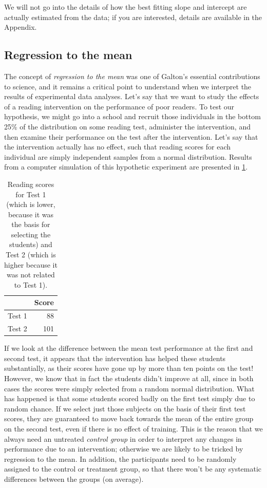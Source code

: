 \documentclass[12pt,]{book}
\theoremstyle{definition}
\theoremstyle{definition}
\theoremstyle{definition}
\theoremstyle{remark}
\begin{document}
We will not go into the details of how the best fitting slope and intercept are actually estimated from the data; if you are interested, details are available in the Appendix.

\hypertarget{regression-to-the-mean}{%
\subsection{Regression to the mean}\label{regression-to-the-mean}}

The concept of \emph{regression to the mean} was one of Galton's essential contributions to science, and it remains a critical point to understand when we interpret the results of experimental data analyses. Let's say that we want to study the effects of a reading intervention on the performance of poor readers. To test our hypothesis, we might go into a school and recruit those individuals in the bottom 25\% of the distribution on some reading test, administer the intervention, and then examine their performance on the test after the intervention. Let's say that the intervention actually has no effect, such that reading scores for each individual are simply independent samples from a normal distribution. Results from a computer simulation of this hypothetic experiment are presented in \ref{tab:readingTable}.

\begin{table}

\caption{\label{tab:readingTable}Reading scores for Test 1 (which is lower, because it was the basis for selecting the students) and Test 2 (which is higher because it was not related to Test 1).}
\centering
\begin{tabular}[t]{l|r}
\hline
  & Score\\
\hline
Test 1 & 88\\
\hline
Test 2 & 101\\
\hline
\end{tabular}
\end{table}

If we look at the difference between the mean test performance at the first and second test, it appears that the intervention has helped these students substantially, as their scores have gone up by more than ten points on the test! However, we know that in fact the students didn't improve at all, since in both cases the scores were simply selected from a random normal distribution. What has happened is that some students scored badly on the first test simply due to random chance. If we select just those subjects on the basis of their first test scores, they are guaranteed to move back towards the mean of the entire group on the second test, even if there is no effect of training. This is the reason that we always need an untreated \emph{control group} in order to interpret any changes in performance due to an intervention; otherwise we are likely to be tricked by regression to the mean. In addition, the participants need to be randomly assigned to the control or treatment group, so that there won't be any systematic differences between the groups (on average).
\end{document}
